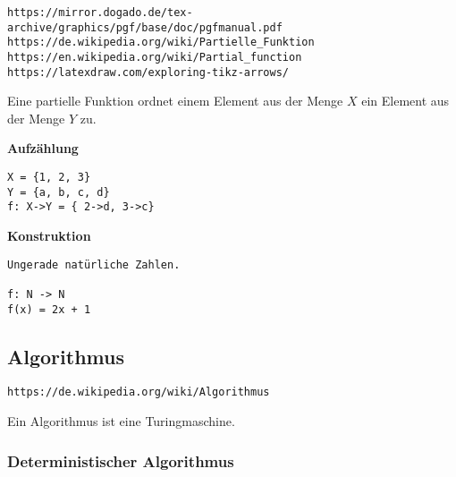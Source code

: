 \documentclass[10pt,a4paper]{article}
\begin{document}
\verb+https://mirror.dogado.de/tex-archive/graphics/pgf/base/doc/pgfmanual.pdf+ \\
\verb+https://de.wikipedia.org/wiki/Partielle_Funktion+ \\
\verb+https://en.wikipedia.org/wiki/Partial_function+ \\
\verb+https://latexdraw.com/exploring-tikz-arrows/+
\vskip 8pt

Eine partielle Funktion ordnet einem Element aus der Menge $X$ ein
Element aus der Menge $Y$ zu.

\vskip 16pt
{\bf Aufzählung}

\vskip 16pt
\begin{verbatim}
X = {1, 2, 3}
Y = {a, b, c, d}
f: X->Y = { 2->d, 3->c}
\end{verbatim}


\vskip 16pt
{\bf Konstruktion}

\begin{verbatim}
Ungerade natürliche Zahlen.

f: N -> N
f(x) = 2x + 1
\end{verbatim}


\subsection {Algorithmus}

\verb+https://de.wikipedia.org/wiki/Algorithmus+
\vskip 8pt

Ein Algorithmus ist eine Turingmaschine.

\subsubsection {Deterministischer Algorithmus}
\end{document}
